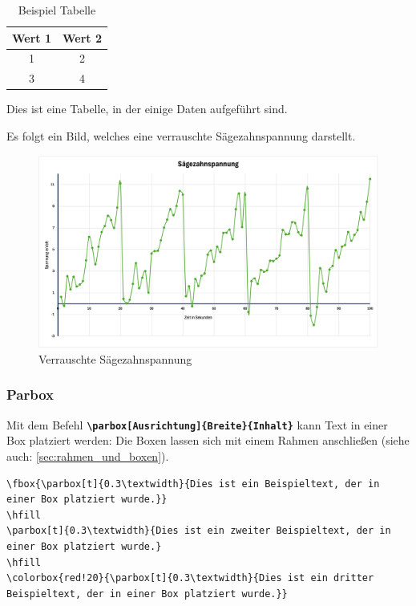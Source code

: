 \begin{minipage}[c]{0.45\textwidth}
    \begin{table}[H]
        \centering
        \begin{tabular}{|c|c|}
            \hline
            \textbf{Wert 1} & \textbf{Wert 2} \\
            \hline
            1               & 2               \\
            3               & 4               \\
            \hline
        \end{tabular}
        \caption{Beispiel Tabelle}
        \label{tab:beispiel_tabelle}
    \end{table}
    Dies ist eine Tabelle, in der einige Daten aufgeführt sind.
\end{minipage}
\hfill
\begin{minipage}[c]{0.45\textwidth}
    Es folgt ein Bild, welches eine verrauschte Sägezahnspannung darstellt.
    \begin{figure}[H]
        \centering
        \includegraphics[width=0.8\linewidth]{anlagen/bilder/Graph.png}
        \caption{Verrauschte Sägezahnspannung}
        \label{fig:verrauschte_saegezahnspannung}
    \end{figure}
\end{minipage}

\subsubsection{Parbox}
Mit dem Befehl \textbf{\texttt{\textbackslash parbox[Ausrichtung]\{Breite\}\{Inhalt\}}} kann Text in einer Box platziert werden:
Die Boxen lassen sich mit einem Rahmen anschließen (siehe auch: \autoref{sec:rahmen_und_boxen}).

\begin{lstlisting}[language={[LaTeX]TeX}, basicstyle=\small]
\fbox{\parbox[t]{0.3\textwidth}{Dies ist ein Beispieltext, der in einer Box platziert wurde.}}
\hfill
\parbox[t]{0.3\textwidth}{Dies ist ein zweiter Beispieltext, der in einer Box platziert wurde.}
\hfill
\colorbox{red!20}{\parbox[t]{0.3\textwidth}{Dies ist ein dritter Beispieltext, der in einer Box platziert wurde.}}
\end{lstlisting}

